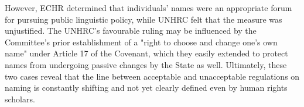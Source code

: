 However, ECHR determined that individuals' names were an appropriate forum for pursuing public linguistic policy, while UNHRC felt that the measure was unjustified. The UNHRC's favourable ruling may be influenced by the Committee's prior establishment of a "right to choose and change one's own name" under Article 17 of the Covenant, which they easily extended to protect names from undergoing passive changes by the State as well. Ultimately, these two cases reveal that the line between acceptable and unacceptable regulations on naming is constantly shifting and not yet clearly defined even by human rights scholars.
